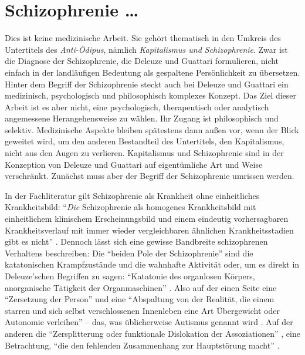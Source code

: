 \documentclass[12pt,
               paper=a4,
               twoside=false,
               onehalfspacing,
               bibliography=totoc,
               toc=graduated,
               ]{scrartcl}
\newcommand{\pc}[2]{\parencite[#1]{#2}}
\newcommand{\vgl}[2]{\parencite[vgl.][#1]{#2}}
\newcommand{\worries}[1]{\ifdraft{\textcolor{blue}{\texttt{(#1)}}}{}}
\newcommand{\dg}{Deleuze und Guattari\xspace}
\begin{document}

\section{Schizophrenie \dots}


Dies ist keine medizinische Arbeit. Sie gehört thematisch in den
Umkreis des Untertitels des \emph{Anti-Ödipus}, nämlich
\emph{Kapitalismus und Schizophrenie}. Zwar ist die Diagnose der
Schizophrenie, die Deleuze und Guattari formulieren, nicht einfach in
der landläufigen Bedeutung als \glq gespaltene Persönlichkeit\grq{} zu
übersetzen. Hinter dem Begriff der Schizophrenie steckt auch bei
Deleuze und Guattari ein medizinisch, psychologisch und philosophisch
komplexes Konzept. Das Ziel dieser Arbeit ist es aber nicht, eine
psychologisch, therapeutisch oder analytisch angemessene
Herangehensweise zu wählen. Ihr Zugang ist philosophisch und selektiv.
Medizinische Aspekte bleiben spätestens dann außen vor, wenn der Blick
geweitet wird, um den anderen Bestandteil des Untertitels, den
Kapitalismus, nicht aus den Augen zu verlieren. Kapitalismus und
Schizophrenie sind in der Konzeption von \dg auf eigentümliche Art und
Weise verschränkt. Zunächst muss aber der Begriff der Schizophrenie
umrissen werden.

In der Fachliteratur gilt Schizophrenie als Krankheit ohne
einheitliches Krankheitsbild: "`\emph{Die} Schizophrenie als homogenes
Krankheitsbild mit einheitlichem klinischem Erscheinungsbild und einem
eindeutig vorhersagbaren Krankheitsverlauf mit immer wieder
vergleichbaren ähnlichen Krankheitsstadien gibt es nicht"' \pc{S. 799,
Hervorh. im Orig.}{psych}. Dennoch lässt sich eine gewisse Bandbreite
schizophrenen Verhaltens beschreiben: Die "`beiden Pole der
Schizophrenie"' \pc{21}{schizg} sind die katatonischen Krampfzustände
und die wahnhafte Aktivität oder, um es direkt in Deleuze'schen
Begriffen zu sagen: "`Katatonie des organlosen Körpers, anorganische
Tätigkeit der Organmaschinen"' \pc{21}{schizg}. Also auf der einen
Seite eine "`Zersetzung der Person"' und eine "`Abspaltung von der
Realität, die einem starren und sich selbst verschlossenen Innenleben
eine Art Übergewicht oder Autonomie verleihen"' \pc{23}{schizg} --
das, was üblicherweise Autismus genannt wird \vgl{801}{psych}. Auf der
anderen die "`Zersplitterung oder funktionale Dislokation der
Assoziationen"' \pc{23}{schizg}, eine Betrachtung, "`die den fehlenden
Zusammenhang zur Hauptstörung macht"' \pc{23}{schizg}.
\end{document}
